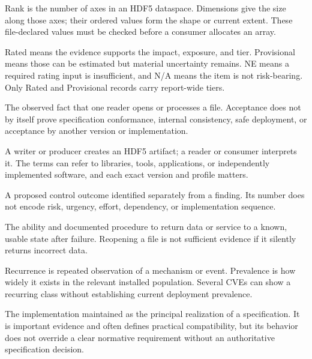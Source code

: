 \documentclass[../main.tex]{subfiles}
\begin{document}
\begin{description}[leftmargin=1.5em,style=nextline]

\item[Rank / dimension / shape / extent.]
Rank is the number of axes in an HDF5 dataspace. Dimensions give the size along
those axes; their ordered values form the shape or current extent. These
file-declared values must be checked before a consumer allocates an array.

\item[Rating status: Rated, Provisional, NE, and N/A.]
Rated means the evidence supports the impact, exposure, and tier. Provisional
means those can be estimated but material uncertainty remains. NE means a
required rating input is insufficient, and N/A means the item is not
risk-bearing. Only Rated and Provisional records carry report-wide tiers.

\item[Reader acceptance.]
The observed fact that one reader opens or processes a file. Acceptance does
not by itself prove specification conformance, internal consistency, safe
deployment, or acceptance by another version or implementation.

\item[Reader / writer / producer / consumer.]
A writer or producer creates an HDF5 artifact; a reader or consumer interprets
it. The terms can refer to libraries, tools, applications, or independently
implemented software, and each exact version and profile matters.

\item[Recommendation.]
A proposed control outcome identified separately from a finding. Its number
does not encode risk, urgency, effort, dependency, or implementation sequence.

\item[Recovery / recoverability.]
The ability and documented procedure to return data or service to a known,
usable state after failure. Reopening a file is not sufficient evidence if it
silently returns incorrect data.

\item[Recurrence / prevalence.]
Recurrence is repeated observation of a mechanism or event. Prevalence is how
widely it exists in the relevant installed population. Several CVEs can show a
recurring class without establishing current deployment prevalence.

\item[Reference implementation.]
The implementation maintained as the principal realization of a specification.
It is important evidence and often defines practical compatibility, but its
behavior does not override a clear normative requirement without an
authoritative specification decision.


\end{description}
\end{document}
